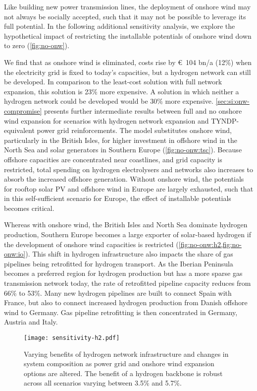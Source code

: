 Like building new power transmission lines, the deployment of onshore wind may
not always be socially accepted, such that it may not be possible to leverage
its full potential. In the following additional sensitivity analysis, we explore
the hypothetical impact of restricting the installable potentials of onshore
wind down to zero (\cref{fig:no-onw}).

We find that as onshore wind is eliminated, costs rise by \euro~104 bn/a (12\%)
when the electricity grid is fixed to today's capacities, but a hydrogen network
can still be developed. In comparison to the least-cost solution with full
network expansion, this solution is 23\% more expensive. A solution in which
neither a hydrogen network could be developed would be 30\% more expensive.
\cref{sec:si:onw-compromise} presents further intermediate results between full
and no onshore wind expansion for scenarios with hydrogen network expansion and
TYNDP-equivalent power grid reinforcements. The model substitutes onshore wind,
particularly in the British Isles, for higher investment in offshore wind in the
North Sea and solar generators in Southern Europe (\cref{fig:no-onw:tsc}).
Because offshore capacities are concentrated near coastlines, and grid capacity
is restricted, total spending on hydrogen electrolysers and networks also
increases to absorb the increased offshore generation. Without onshore wind, the
potentials for rooftop solar PV and offshore wind in Europe are largely
exhausted, such that in this self-sufficient scenario for Europe, the effect of
installable potentials becomes critical.

Whereas with onshore wind, the British Isles and North Sea dominate hydrogen
production, Southern Europe becomes a large exporter of solar-based hydrogen if
the development of onshore wind capacities is restricted
(\cref{fig:no-onw:h2,fig:no-onw:io}). This shift in hydrogen infrastructure also
impacts the share of gas pipelines being retrofitted for hydrogen transport. As
the Iberian Peninsula becomes a preferred region for hydrogen production but has
a more sparse gas transmission network today, the rate of retrofitted pipeline
capacity reduces from 66\% to 53\%. Many new hydrogen pipelines are built to
connect Spain with France, but also to connect increased hydrogen production
from Danish offshore wind to Germany. Gas pipeline retrofitting is then
concentrated in Germany, Austria and Italy.

\begin{figure}
    \centering
    \texttt{[image: sensitivity-h2.pdf]}
    \caption{Varying benefits of hydrogen network infrastructure and changes in system composition as power grid and onshore wind expansion options are altered. The benefit of a hydrogen backbone is robust across all scenarios varying between 3.5\% and 5.7\%.}
    \label{fig:h2-restriction-w-onw}
\end{figure}

